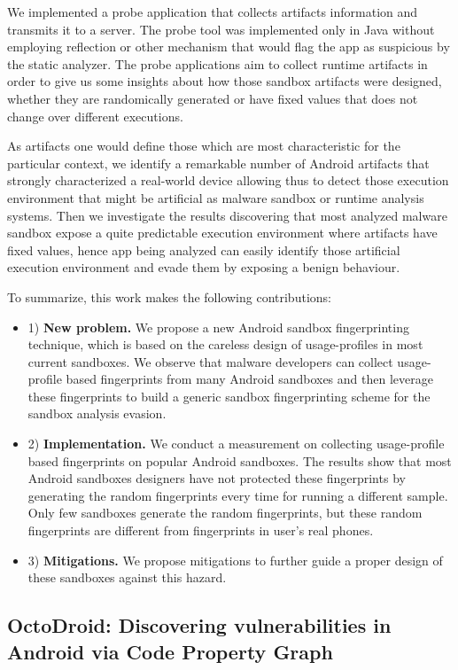 We implemented a probe application that collects artifacts information and transmits it to a server. The probe tool was implemented only in Java without employing reflection or other mechanism that would flag the app as suspicious by the static analyzer. The probe applications aim to collect runtime artifacts in order to give us some insights about how those sandbox artifacts were designed, whether they are randomically generated or have fixed values that does not change over different executions. 

As artifacts one would define those which are most characteristic for the particular context, we identify a remarkable number of Android artifacts that strongly characterized a real-world device allowing thus to detect those execution environment that might be artificial as malware sandbox or runtime analysis systems. Then we investigate the results discovering that most analyzed malware sandbox expose a quite predictable execution environment where artifacts have fixed values, hence app being analyzed can easily identify those artificial execution environment and evade them by exposing a benign behaviour.

To summarize, this work makes the following contributions:
\begin{itemize}
\item 1) {\bf New problem.} We propose a new Android sandbox fingerprinting technique, which is based on the careless design of usage-profiles in most current sandboxes. We observe that malware developers can collect usage-profile based fingerprints from many Android sandboxes and then leverage these fingerprints to build a generic sandbox fingerprinting scheme for the sandbox analysis evasion. 
\item 2) {\bf Implementation.} We conduct a measurement on collecting usage-profile based fingerprints on popular Android sandboxes. The results show that most Android sandboxes designers have not protected these fingerprints by generating the random fingerprints every time for running a different sample. Only few sandboxes generate the random fingerprints, but these random fingerprints are different from fingerprints in user's real phones.
\item 3) {\bf Mitigations.} We propose mitigations to further guide a proper design of these sandboxes against this hazard.
\end{itemize}

\subsection{OctoDroid: Discovering vulnerabilities in Android via Code Property Graph}

